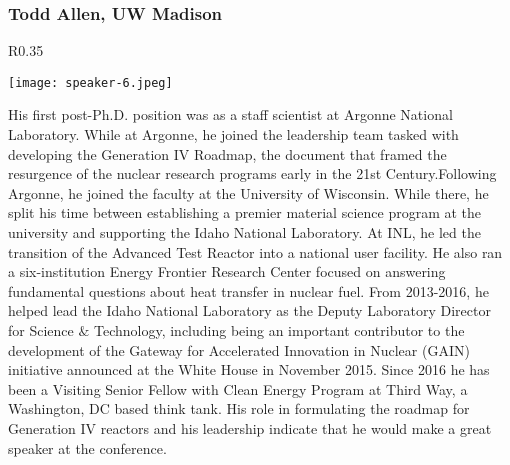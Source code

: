 \subsubsection{Todd Allen, UW Madison}
\setlength\intextsep{0pt}
\begin{wrapfigure}{R}{0.35\textwidth}
	\begin{center}
		\vspace{-\baselineskip}
		\texttt{[image: speaker-6.jpeg]}
	\end{center}
\end{wrapfigure}
His first post-Ph.D. position was as a staff scientist at Argonne National Laboratory. While at Argonne, he joined the leadership team tasked with developing the Generation IV Roadmap, the document that framed the resurgence of the nuclear research programs early in the 21st Century.Following Argonne, he joined the faculty at the University of Wisconsin. While there, he split his time between establishing a premier material science program at the university and supporting the Idaho National Laboratory. At INL, he led the transition of the Advanced Test Reactor into a national user facility. He also ran a six-institution Energy Frontier Research Center focused on answering fundamental questions about heat transfer in nuclear fuel.
From 2013-2016, he helped lead the Idaho National Laboratory as the Deputy Laboratory Director for Science $\&$ Technology, including being an important contributor to the development of the Gateway for Accelerated Innovation in Nuclear (GAIN) initiative announced at the White House in November 2015. Since 2016 he has been a Visiting Senior Fellow with Clean Energy Program at Third Way, a Washington, DC based think tank. His role in formulating the roadmap for Generation IV reactors and his leadership indicate that he would make a great speaker at the conference.\\


